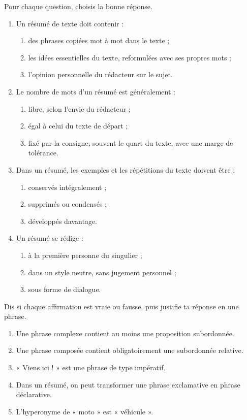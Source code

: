 \documentclass[11pt]{article}
\begin{document}
\begin{exercice}
Pour chaque question, choisis la bonne réponse.
\begin{enumerate}
\item Un résumé de texte doit contenir :
\begin{enumerate}
\item des phrases copiées mot à mot dans le texte ;
\item les idées essentielles du texte, reformulées avec ses propres mots ;
\item l'opinion personnelle du rédacteur sur le sujet.
\end{enumerate}
\item Le nombre de mots d'un résumé est généralement :
\begin{enumerate}
\item libre, selon l'envie du rédacteur ;
\item égal à celui du texte de départ ;
\item fixé par la consigne, souvent le quart du texte, avec une marge de tolérance.
\end{enumerate}
\item Dans un résumé, les exemples et les répétitions du texte doivent être :
\begin{enumerate}
\item conservés intégralement ;
\item supprimés ou condensés ;
\item développés davantage.
\end{enumerate}
\item Un résumé se rédige :
\begin{enumerate}
\item à la première personne du singulier ;
\item dans un style neutre, sans jugement personnel ;
\item sous forme de dialogue.
\end{enumerate}
\end{enumerate}
\end{exercice}

\begin{exercice}
Dis si chaque affirmation est vraie ou fausse, puis justifie ta réponse en une phrase.
\begin{enumerate}
\item Une phrase complexe contient au moins une proposition subordonnée.
\item Une phrase composée contient obligatoirement une subordonnée relative.
\item « Viens ici ! » est une phrase de type impératif.
\item Dans un résumé, on peut transformer une phrase exclamative en phrase déclarative.
\item L'hyperonyme de « moto » est « véhicule ».
\end{enumerate}
\end{exercice}
\end{document}
